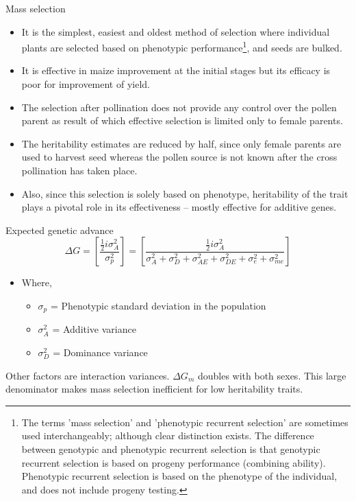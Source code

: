 \documentclass[11pt,ignorenonframetext,aspectratio=169]{beamer}
\providecommand{\tightlist}{%
  \setlength{\itemsep}{0pt}\setlength{\parskip}{0pt}}
\begin{document}
\begin{frame}{Mass selection}
\protect\hypertarget{mass-selection}{}
\begin{itemize}
\tightlist
\item
  It is the simplest, easiest and oldest method of selection where
  individual plants are selected based on phenotypic
  performance\footnote[frame]{\scriptsize The terms 'mass selection' and 'phenotypic recurrent selection' are sometimes used interchangeably; although clear distinction exists. The difference between genotypic and phenotypic recurrent selection is that genotypic recurrent selection is based on progeny performance (combining ability). Phenotypic recurrent selection is based on the phenotype of the individual, and does not include progeny testing.},
  and seeds are bulked.
\item
  It is effective in maize improvement at the initial stages but its
  efficacy is poor for improvement of yield.
\item
  The selection after pollination does not provide any control over the
  pollen parent as result of which effective selection is limited only
  to female parents.
\item
  The heritability estimates are reduced by half, since only female
  parents are used to harvest seed whereas the pollen source is not
  known after the cross pollination has taken place.
\item
  Also, since this selection is solely based on phenotype, heritability
  of the trait plays a pivotal role in its effectiveness -- mostly
  effective for additive genes.
\end{itemize}
\end{frame}

\begin{frame}{Expected genetic advance}
\protect\hypertarget{expected-genetic-advance}{}
\[
\Delta G = \left[ \frac{\frac{1}{2}i \sigma^2_A}{\sigma^2_p} \right] = \left[ \frac{\frac{1}{2}i \sigma^2_A}{\sigma^2_A + \sigma^2_D + \sigma^2_{AE} + \sigma^2_{DE} + \sigma^2_e + \sigma^2_{me}} \right]
\]

\begin{itemize}
\tightlist
\item
  Where,

  \begin{itemize}
  \tightlist
  \item
    \(\sigma_p\) = Phenotypic standard deviation in the population
  \item
    \(\sigma^2_A\) = Additive variance
  \item
    \(\sigma^2_D\) = Dominance variance
  \end{itemize}
\end{itemize}

Other factors are interaction variances. \(\Delta G_m\) doubles with
both sexes. This large denominator makes mass selection inefficient for
low heritability traits.
\end{frame}
\end{document}

